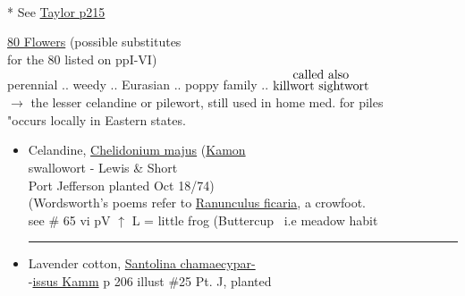 \documentclass[a4paper,10pt]{article}
\begin{document}
\color{blue}
\begin{flushright}
\\
\end{flushright}
\begin{flushleft}
\color{red} 
\begin{turn}{25}%
* See \ul{Taylor p215} 
\end{turn}
\ul{80 Flowers} (possible substitutes\\
\color{red}for the 80 listed on ppI-VI) \hfill \color{blue} \\

\color{red}
\small
{} perennial .. weedy .. Eurasian .. poppy family .. {$\stackrel{\hbox{called also}}{\hbox{killwort sightwort}}$}\\
 $\rightarrow$ the lesser celandine or pilewort, still used in home med. for piles\\
"occurs locally in Eastern states.\\
\begin{itemize}
\color{blue}
\normalsize
\item Celandine, \ul{Chelidonium majus} (\ul{Kamon}\\
\tiny 
\color{red}
swallowort - Lewis \& Short\\
\color{blue}
\normalsize
\color{red}
 \color{blue}Port Jefferson planted Oct 18/74)\\
\color{red}
\small
{} (Wordsworth's poems refer to \ul{Ranunculus ficaria}, a crowfoot.\\
see \# 65 vi pV 
\color{blue}
$\uparrow$ L = little frog (Buttercup \ i.e meadow habit
\rule{10cm}{0.01cm}
\normalsize
\item Lavender cotton, \ul{Santolina chamaecypar-}\\
-\ul{issus Kamm} p 206 illust \#25 Pt. J, planted\\ 
\color{red}
\tiny
\newsavebox{\abc}
%
\begin{turn}{25}\usebox{\abc}\end{turn}

\end{itemize}
\end{flushleft}
\end{document}
